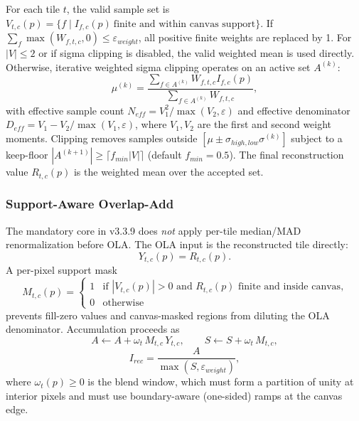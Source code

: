 \documentclass[10pt,twocolumn]{article}
\begin{document}
For each tile $t$, the valid sample set is
$V_{t,c}(p)=\{f\mid I_{f,c}(p)~\text{finite and within canvas support}\}$.
If $\sum_f\max(W_{f,t,c},0)\le\varepsilon_{weight}$, all positive finite weights are replaced
by 1. For $|V|\le2$ or if sigma clipping is disabled, the valid weighted mean is used directly.
Otherwise, iterative weighted sigma clipping operates on an active set $A^{(k)}$:
\begin{equation}
  \mu^{(k)} = \frac{\sum_{f\in A^{(k)}} W_{f,t,c}I_{f,c}(p)}{\sum_{f\in A^{(k)}} W_{f,t,c}},
\end{equation}
with effective sample count $N_{eff}=V_1^2/\max(V_2,\varepsilon)$ and effective denominator
$D_{eff}=V_1-V_2/\max(V_1,\varepsilon)$, where $V_1,V_2$ are the first and second weight moments.
Clipping removes samples outside $[\mu\pm\sigma_{high,low}\sigma^{(k)}]$ subject to a keep-floor
$|A^{(k+1)}|\ge\lceil f_{min}|V|\rceil$ (default $f_{min}=0.5$). The final reconstruction value
$R_{t,c}(p)$ is the weighted mean over the accepted set.

\subsubsection{Support-Aware Overlap-Add}

The mandatory core in v3.3.9 does \emph{not} apply per-tile median/MAD renormalization before
OLA. The OLA input is the reconstructed tile directly:
\begin{equation}
  Y_{t,c}(p) = R_{t,c}(p).
\end{equation}
A per-pixel support mask
\begin{equation}
  M_{t,c}(p) =
  \begin{cases}
    1 & \text{if } |V_{t,c}(p)|>0 \text{ and } R_{t,c}(p) \text{ finite and inside canvas,} \\
    0 & \text{otherwise}
  \end{cases}
\end{equation}
prevents fill-zero values and canvas-masked regions from diluting the OLA denominator.
Accumulation proceeds as
\begin{equation}
  A \leftarrow A + \omega_t\,M_{t,c}\,Y_{t,c},
  \qquad
  S \leftarrow S + \omega_t\,M_{t,c},
\end{equation}
\begin{equation}
  I_{rec} = \frac{A}{\max(S,\varepsilon_{weight})},
\end{equation}
where $\omega_t(p)\ge0$ is the blend window, which must form a partition of unity at interior
pixels and must use boundary-aware (one-sided) ramps at the canvas edge.
\end{document}
